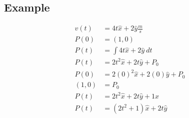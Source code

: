 \documentclass{article}
\theoremstyle{mytheoremstyle}
\theoremstyle{mytheoremstyle}
\theoremstyle{myproblemstyle}
\begin{document}
    \subsection*{Example}
    \begin{align*}
        v(t) &= 4t\hat{x} + 2\hat{y} \frac{m}{s} \\
        P(0) &= (1,0) \\
        P(t) &= \int 4t\hat{x} + 2\hat{y} \ dt \\
        P(t) &= 2t^2\hat{x} + 2t\hat{y} + P_0 \\
        P(0) &= 2(0)^2\hat{x} + 2(0)\hat{y} + P_0 \\
        (1,0) &= P_0 \\
        P(t) &= 2t^2\hat{x} + 2t\hat{y} + 1\hat{x} \\
        P(t) &= (2t^2 + 1)\hat{x} + 2t\hat{y} \\
    \end{align*}
\end{document}
